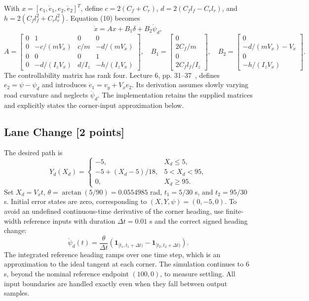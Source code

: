 \documentclass{article}
\begin{document}
With $x=[e_1,\dot e_1,e_2,\dot e_2]^T$, define $c=2(C_f+C_r)$, $d=2(C_fl_f-C_rl_r)$, and $h=2(C_fl_f^2+C_rl_r^2)$. Equation (10) becomes
\[
\dot x=Ax+B_1\delta+B_2\dot\psi_d,
\]
\[
A=\begin{bmatrix}
0&1&0&0\\
0&-c/(mV_x)&c/m&-d/(mV_x)\\
0&0&0&1\\
0&-d/(I_zV_x)&d/I_z&-h/(I_zV_x)
\end{bmatrix},\quad
B_1=\begin{bmatrix}0\\2C_f/m\\0\\2C_fl_f/I_z\end{bmatrix},\quad
B_2=\begin{bmatrix}0\\-d/(mV_x)-V_x\\0\\-h/(I_zV_x)\end{bmatrix}.
\]
The controllability matrix has rank four. Lecture 6, pp. 31--37~\cite{controls2}, defines $e_2=\psi-\psi_d$ and introduces $\dot e_1=v_y+V_xe_2$. Its derivation assumes slowly varying road curvature and neglects $\ddot\psi_d$. The implementation retains the supplied matrices and explicitly states the corner-input approximation below.

\subsection{Lane Change [2 points]}
The desired path is
\[
Y_d(X_d)=\begin{cases}
-5,&X_d\le5,\\
-5+(X_d-5)/18,&5<X_d<95,\\
0,&X_d\ge95.
\end{cases}
\]
Set $X_d=V_xt$, $\theta=\arctan(5/90)=0.0554985$ rad, $t_1=5/30$ s, and $t_2=95/30$ s. Initial error states are zero, corresponding to $(X,Y,\psi)=(0,-5,0)$. To avoid an undefined continuous-time derivative of the corner heading, use finite-width reference inputs with duration $\Delta t=0.01$ s and the correct signed heading change:
\[
\dot\psi_d(t)=\frac{\theta}{\Delta t}\left(
\mathbf1_{[t_1,t_1+\Delta t)}-
\mathbf1_{[t_2,t_2+\Delta t)}\right).
\]
The integrated reference heading ramps over one time step, which is an approximation to the ideal tangent at each corner. The simulation continues to $6$ s, beyond the nominal reference endpoint $(100,0)$, to measure settling. All input boundaries are handled exactly even when they fall between output samples.
\end{document}
